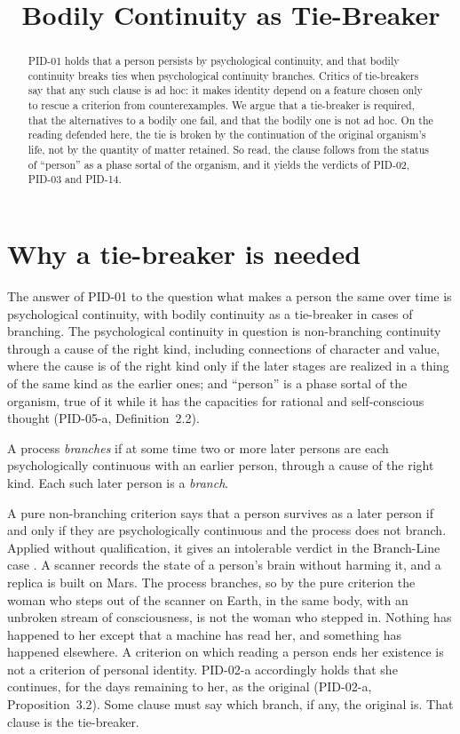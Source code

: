 \documentclass{situationist-preprint}
\title{Bodily Continuity as Tie-Breaker}
\begin{document}
\maketitle

\begin{abstract}
PID-01 holds that a person persists by psychological continuity, and that bodily continuity breaks ties when psychological continuity branches. Critics of tie-breakers say that any such clause is ad hoc: it makes identity depend on a feature chosen only to rescue a criterion from counterexamples. We argue that a tie-breaker is required, that the alternatives to a bodily one fail, and that the bodily one is not ad hoc. On the reading defended here, the tie is broken by the continuation of the original organism's life, not by the quantity of matter retained. So read, the clause follows from the status of \enquote{person} as a phase sortal of the organism, and it yields the verdicts of PID-02, PID-03 and PID-14.
\end{abstract}

\section{Why a tie-breaker is needed}

The answer of PID-01 to the question what makes a person the same over time is psychological continuity, with bodily continuity as a tie-breaker in cases of branching. The psychological continuity in question is non-branching continuity through a cause of the right kind, including connections of character and value, where the cause is of the right kind only if the later stages are realized in a thing of the same kind as the earlier ones; and \enquote{person} is a phase sortal of the organism, true of it while it has the capacities for rational and self-conscious thought (PID-05-a, Definition~2.2).

\begin{definition}\label{d:branch}
A process \emph{branches} if at some time two or more later persons are each psychologically continuous with an earlier person, through a cause of the right kind. Each such later person is a \emph{branch}.
\end{definition}

A pure non-branching criterion says that a person survives as a later person if and only if they are psychologically continuous and the process does not branch. Applied without qualification, it gives an intolerable verdict in the Branch-Line case \citep[ch.~10]{Parfit1984}. A scanner records the state of a person's brain without harming it, and a replica is built on Mars. The process branches, so by the pure criterion the woman who steps out of the scanner on Earth, in the same body, with an unbroken stream of consciousness, is not the woman who stepped in. Nothing has happened to her except that a machine has read her, and something has happened elsewhere. A criterion on which reading a person ends her existence is not a criterion of personal identity. PID-02-a accordingly holds that she continues, for the days remaining to her, as the original (PID-02-a, Proposition~3.2). Some clause must say which branch, if any, the original is. That clause is the tie-breaker.
\end{document}
